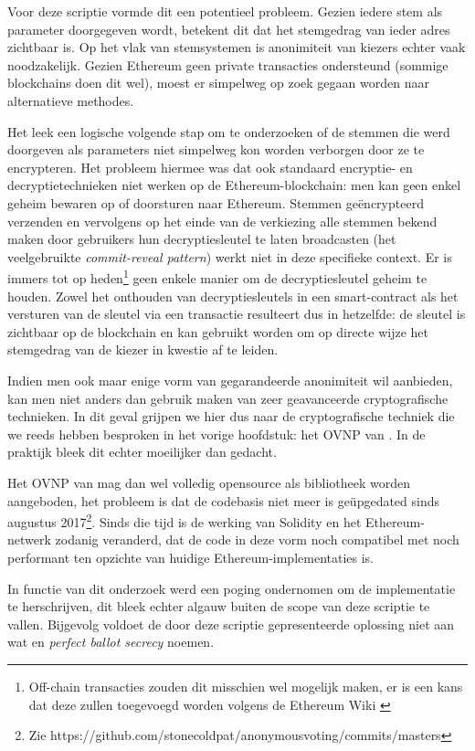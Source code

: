 	Voor deze scriptie vormde dit een potentieel probleem. Gezien iedere stem als parameter doorgegeven wordt, betekent dit dat het stemgedrag van ieder adres zichtbaar is. Op het vlak van stemsystemen is anonimiteit van kiezers  echter vaak noodzakelijk. Gezien Ethereum geen private transacties ondersteund (sommige blockchains doen dit wel),  moest er simpelweg op zoek gegaan worden naar alternatieve methodes. 
	
	Het leek een logische volgende stap om te onderzoeken of de stemmen die werd doorgeven als parameters niet simpelweg kon worden verborgen door ze te encrypteren. Het probleem hiermee was dat ook standaard encryptie- en decryptietechnieken niet werken op de Ethereum-blockchain: men kan geen enkel geheim bewaren op of doorsturen naar Ethereum. Stemmen geëncrypteerd verzenden en vervolgens op het einde van de verkiezing alle stemmen bekend maken door gebruikers hun decryptiesleutel te laten broadcasten (het veelgebruikte \textit{commit-reveal pattern}) werkt niet in deze specifieke context. Er is immers tot op heden\footnote{Off-chain transacties zouden dit misschien wel mogelijk maken, er is een kans dat deze zullen toegevoegd worden volgens de Ethereum Wiki \autocite{Buterin2014}} geen enkele manier om de decryptiesleutel geheim te houden. Zowel het onthouden van decryptiesleutels  in een smart-contract als het versturen van de sleutel via een transactie resulteert dus in hetzelfde: de sleutel is zichtbaar op de blockchain en kan gebruikt worden om op directe wijze het stemgedrag van de kiezer in kwestie af te leiden.
	
	Indien men ook maar enige vorm van gegarandeerde anonimiteit wil aanbieden, kan men niet anders dan gebruik maken van zeer geavanceerde cryptografische technieken. In dit geval grijpen we hier dus naar de cryptografische techniek die we reeds hebben besproken in het vorige hoofdstuk: het OVNP van \textcite{McCorry2017}. In de praktijk bleek dit echter moeilijker dan gedacht. 
	
	 Het OVNP van \textcite{McCorry2017} mag dan wel volledig opensource als bibliotheek worden aangeboden, het probleem is dat de codebasis niet meer is geüpgedated sinds augustus 2017\footnote{Zie https://github.com/stonecoldpat/anonymousvoting/commits/masters}. Sinds die tijd is de werking van Solidity en het Ethereum-netwerk zodanig veranderd, dat de code in deze vorm noch compatibel met noch performant ten opzichte van huidige Ethereum-implementaties is. 
	 
	 In functie van dit onderzoek werd een poging ondernomen om de implementatie te herschrijven, dit bleek echter algauw buiten de scope van deze scriptie te vallen. Bijgevolg voldoet de door deze scriptie gepresenteerde oplossing niet aan wat \textcite{McCorry2017} en \textcite{Kiayias2002} \textit{perfect ballot secrecy} noemen.

